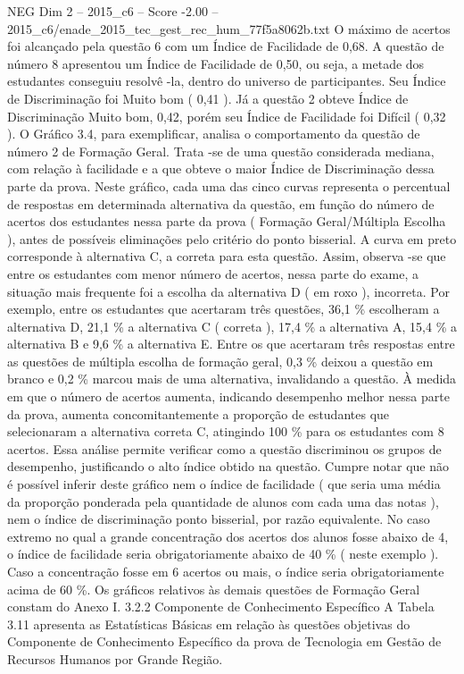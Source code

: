 \begin{textsample}{NEG Dim 2 – 2015\_c6 – Score -2.00 – 2015\_c6/enade\_2015\_tec\_gest\_rec\_hum\_77f5a8062b.txt}
O máximo de acertos foi alcançado pela questão 6 com um Índice de Facilidade de 0,68.
A questão de número 8 apresentou um Índice de Facilidade de 0,50, ou seja, a metade dos estudantes conseguiu resolvê -la, dentro do universo de participantes.
Seu Índice de Discriminação foi Muito bom ( 0,41 ).
Já a questão 2 obteve Índice de Discriminação Muito bom, 0,42, porém seu Índice de Facilidade foi Difícil ( 0,32 ).
O Gráfico 3.4, para exemplificar, analisa o comportamento da questão de número 2 de Formação Geral.
Trata -se de uma questão considerada mediana, com relação à facilidade e a que obteve o maior Índice de Discriminação dessa parte da prova.
Neste gráfico, cada uma das cinco curvas representa o percentual de respostas em determinada alternativa da questão, em função do número de acertos dos estudantes nessa parte da prova ( Formação Geral/Múltipla Escolha ), antes de possíveis eliminações pelo critério do ponto bisserial.
A curva em preto corresponde à alternativa C, a correta para esta questão.
Assim, observa -se que entre os estudantes com menor número de acertos, nessa parte do exame, a situação mais frequente foi a escolha da alternativa D ( em roxo ), incorreta.
Por exemplo, entre os estudantes que acertaram três questões, 36,1 \% escolheram a alternativa D, 21,1 \% a alternativa C ( correta ), 17,4 \% a alternativa A, 15,4 \% a alternativa B e 9,6 \% a alternativa E.
Entre os que acertaram três respostas entre as questões de múltipla escolha de formação geral, 0,3 \% deixou a questão em branco e 0,2 \% marcou mais de uma alternativa, invalidando a questão.
À medida em que o número de acertos aumenta, indicando desempenho melhor nessa parte da prova, aumenta concomitantemente a proporção de estudantes que selecionaram a alternativa correta C, atingindo 100 \% para os estudantes com 8 acertos.
Essa análise permite verificar como a questão discriminou os grupos de desempenho, justificando o alto índice obtido na questão.
Cumpre notar que não é possível inferir deste gráfico nem o índice de facilidade ( que seria uma média da proporção ponderada pela quantidade de alunos com cada uma das notas ), nem o índice de discriminação ponto bisserial, por razão equivalente.
No caso extremo no qual a grande concentração dos acertos dos alunos fosse abaixo de 4, o índice de facilidade seria obrigatoriamente abaixo de 40 \% ( neste exemplo ).
Caso a concentração fosse em 6 acertos ou mais, o índice seria obrigatoriamente acima de 60 \%.
Os gráficos relativos às demais questões de Formação Geral constam do Anexo I. 3.2.2 Componente de Conhecimento Específico A Tabela 3.11 apresenta as Estatísticas Básicas em relação às questões objetivas do Componente de Conhecimento Específico da prova de Tecnologia em Gestão de Recursos Humanos por Grande Região.

\end{textsample}
